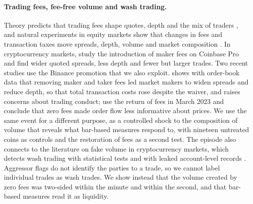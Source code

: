 \paragraph{Trading fees, fee-free volume and wash trading.} Theory predicts that trading fees shape
quotes, depth and the mix of traders \citep{colliard2012,foucault2013}, and natural experiments in
equity markets show that changes in fees and transaction taxes move spreads, depth, volume and market
composition \citep{malinova2015,colliard2017}. In cryptocurrency markets, \citet{brauneis2022} study
the introduction of maker fees on Coinbase Pro and find wider quoted spreads, less depth and fewer
but larger trades. Two recent studies use the Binance promotion that we also exploit.
\citet{galati2024} shows with order-book data that removing maker and taker fees led market makers to
widen spreads and reduce depth, so that total transaction costs rose despite the waiver, and raises
concerns about trading conduct; \citet{bozzetto2026} use the return of fees in March 2023 and
conclude that zero fees made order flow less informative about prices. We use the same event for a
different purpose, as a controlled shock to the composition of volume that reveals what bar-based
measures respond to, with nineteen untreated coins as controls and the restoration of fees as a
second test. The episode also connects to the literature on fake volume in cryptocurrency markets,
which detects wash trading with statistical tests \citep{cong2023,amiram2025} and with leaked
account-level records \citep{aloosh2024}. Aggressor flags do not identify the parties to a trade, so
we cannot label individual trades as wash trades. We show instead that the volume created by zero
fees was two-sided within the minute and within the second, and that bar-based measures read it as
liquidity.

